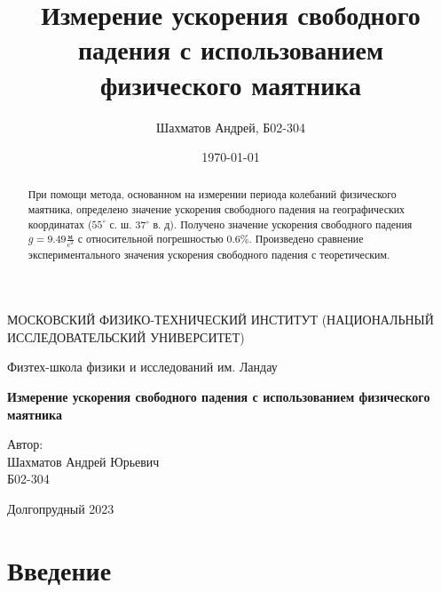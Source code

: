 \documentclass[12pt]{article}
\title{Измерение ускорения свободного падения с использованием физического маятника}
\author{Шахматов Андрей, Б02-304}
\date{\today}
\begin{document}
\begin{titlepage}
    \begin{center}
        {\large МОСКОВСКИЙ ФИЗИКО-ТЕХНИЧЕСКИЙ ИНСТИТУТ (НАЦИОНАЛЬНЫЙ ИССЛЕДОВАТЕЛЬСКИЙ УНИВЕРСИТЕТ)}
    \end{center}
    \begin{center}
        {\large Физтех-школа физики и исследований им. Ландау}
    \end{center}
    
    
    \vspace{3cm}
    {\huge
        \begin{center}
            \textbf{Измерение ускорения свободного падения с использованием физического маятника}
        \end{center}
    }
    \vspace{2cm}
    \begin{flushright}
        {\LARGE Автор:\\ Шахматов Андрей Юрьевич \\
            \vspace{0.2cm}
            Б02-304}
    \end{flushright}
    \vspace{7 cm}
    \begin{center}
        Долгопрудный 2023
    \end{center}
\end{titlepage}


\begin{abstract}
    При помощи метода, основанном на измерении периода колебаний физического маятника, определено значение ускорения свободного падения на географических
    координатах ($55^\circ$ с. ш. $37^\circ$ в. д). Получено значение ускорения свободного падения $g = 9.49 \frac{\textrm{м}}{\textrm{c}^2}$ с 
    относительной погрешностью $0.6\%$. Произведено сравнение экспериментального значения ускорения свободного падения с теоретическим.

\end{abstract}

\tableofcontents

\section{Введение}
\end{document}
